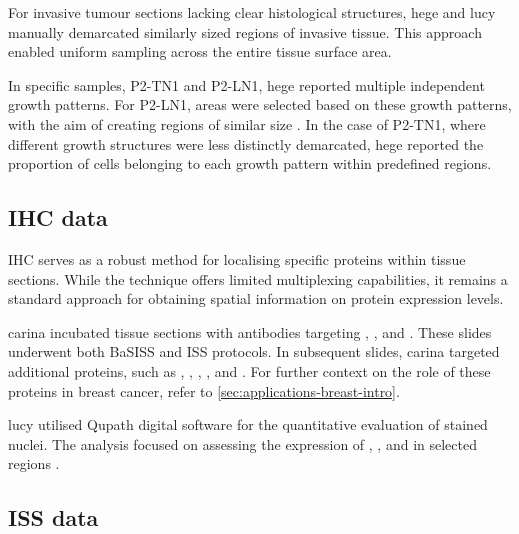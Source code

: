For invasive tumour sections lacking clear histological structures, \acs{hege} and \acs{lucy} manually demarcated similarly sized regions of invasive tissue. This approach enabled uniform sampling across the entire tissue surface area.

In specific samples, P2-TN1 and P2-LN1, \acs{hege} reported multiple independent growth patterns. For P2-LN1, areas were selected based on these growth patterns, with the aim of creating regions of similar size . In the case of P2-TN1, where different growth structures were less distinctly demarcated, \acs{hege} reported the proportion of cells belonging to each growth pattern within predefined regions.

\subsection{\acl{IHC} data}
\label{sec:modalities-ihc}

\acl{IHC} serves as a robust method for localising specific proteins within tissue sections. While the technique offers limited multiplexing capabilities, it remains a standard approach for obtaining spatial information on protein expression levels.

\acf{carina} incubated tissue sections with antibodies targeting , , and . These slides underwent both \ac{BaSISS} and \ac{ISS} protocols. In subsequent slides, \acs{carina} targeted additional proteins, such as , , , , and . For further context on the role of these proteins in breast cancer, refer to \cref{sec:applications-breast-intro}.

\ac{lucy} utilised Qupath digital software for the quantitative evaluation of stained nuclei. The analysis focused on assessing the expression of , , and  in selected regions .

\subsection{\acl{ISS} data}
\label{sec:modalities-iss}


